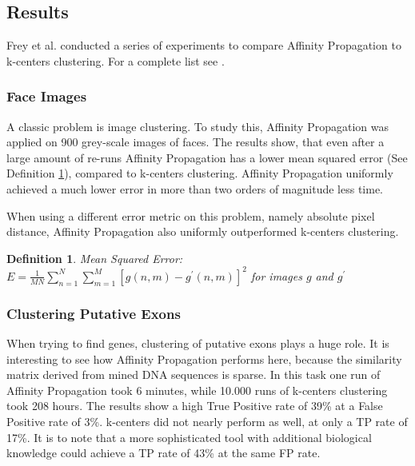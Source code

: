 \documentclass[11pt,a4paper]{article}
\newtheorem{definition}{Definition}
\begin{document}
\subsection{Results}
Frey et al. conducted a series of experiments to compare Affinity Propagation to k-centers clustering. For a complete list see \cite{frey2007clustering}.
\subsubsection{Face Images}
A classic problem is image clustering. To study this, Affinity Propagation was applied on 900 grey-scale images of faces. The results show, that even after a large amount of re-runs Affinity Propagation has a lower mean squared error (See Definition \ref{def:mse}), compared to k-centers clustering. Affinity Propagation uniformly achieved a much lower error in more than two orders of magnitude less time.

When using a different error metric on this problem, namely absolute pixel distance, Affinity Propagation also uniformly outperformed k-centers clustering.
\begin{definition} \label{def:mse}
	Mean Squared Error: $E = \frac{1}{M N}\sum\limits_{n=1}^{N}\sum\limits_{m=1}^{M} \left[g(n,m) - g^\prime (n,m)\right]^2$ for images $g$ and $g^\prime$
\end{definition}
\subsubsection{Clustering Putative Exons}
When trying to find genes, clustering of putative exons plays a huge role. It is interesting to see how Affinity Propagation performs here, because the similarity matrix derived from mined DNA sequences is sparse. In this task one run of Affinity Propagation took 6 minutes, while 10.000 runs of k-centers clustering took 208 hours. The results show a high True Positive rate of 39\% at a False Positive rate of 3\%. k-centers did not nearly perform as well, at only a TP rate of 17\%. It is to note that a more sophisticated tool with additional biological knowledge could achieve a TP rate of 43\% at the same FP rate.
\end{document}
